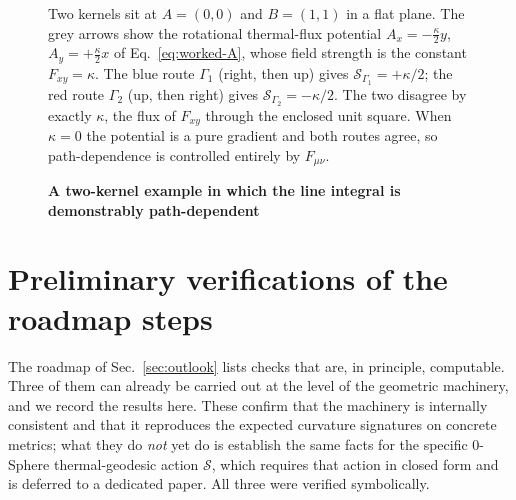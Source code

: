 \documentclass[%
 reprint, amsmath,amssymb, aps, prb, ]{revtex4-2}
\numberwithin{equation}{section}
\begin{document}
\begin{figure}[t!]
\centering
{}
\caption{\textbf{A two-kernel example in which the line integral is demonstrably path-dependent}}
\label{fig:worked}
\vspace{0.4em}
\begin{minipage}{0.95\textwidth}
\justifying\small
Two kernels sit at $A=(0,0)$ and $B=(1,1)$ in a flat plane. The grey arrows show the rotational thermal-flux potential $A_x=-\tfrac{\kappa}{2}y$, $A_y=+\tfrac{\kappa}{2}x$ of Eq.~\eqref{eq:worked-A}, whose field strength is the constant $F_{xy}=\kappa$. The blue route $\Gamma_1$ (right, then up) gives $\mathcal{S}_{\Gamma_1}=+\kappa/2$; the red route $\Gamma_2$ (up, then right) gives $\mathcal{S}_{\Gamma_2}=-\kappa/2$. The two disagree by exactly $\kappa$, the flux of $F_{xy}$ through the enclosed unit square. When $\kappa=0$ the potential is a pure gradient and both routes agree, so path-dependence is controlled entirely by $F_{\mu\nu}$.
\end{minipage}
\end{figure}

\section{Preliminary verifications of the roadmap steps}
\label{app:checks}

The roadmap of Sec.~\ref{sec:outlook} lists checks that are, in principle, computable. Three of them can already be carried out at the level of the geometric machinery, and we record the results here. These confirm that the machinery is internally consistent and that it reproduces the expected curvature signatures on concrete metrics; what they do \emph{not} yet do is establish the same facts for the specific 0-Sphere thermal-geodesic action $\mathcal{S}$, which requires that action in closed form and is deferred to a dedicated paper. All three were verified symbolically.
\end{document}
